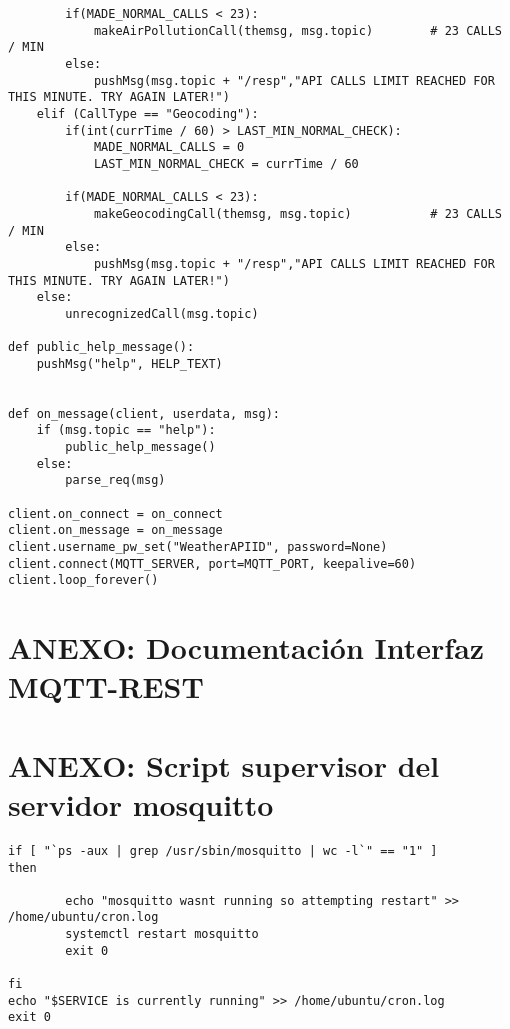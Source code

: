 \documentclass{scrbook}
\begin{document}
{\begin{verbatim}
        if(MADE_NORMAL_CALLS < 23):
            makeAirPollutionCall(themsg, msg.topic)        # 23 CALLS / MIN
        else:
            pushMsg(msg.topic + "/resp","API CALLS LIMIT REACHED FOR THIS MINUTE. TRY AGAIN LATER!")
    elif (CallType == "Geocoding"):
        if(int(currTime / 60) > LAST_MIN_NORMAL_CHECK):
            MADE_NORMAL_CALLS = 0
            LAST_MIN_NORMAL_CHECK = currTime / 60

        if(MADE_NORMAL_CALLS < 23):
            makeGeocodingCall(themsg, msg.topic)           # 23 CALLS / MIN
        else:
            pushMsg(msg.topic + "/resp","API CALLS LIMIT REACHED FOR THIS MINUTE. TRY AGAIN LATER!")
    else:
        unrecognizedCall(msg.topic)

def public_help_message():
    pushMsg("help", HELP_TEXT)


def on_message(client, userdata, msg):
    if (msg.topic == "help"):
        public_help_message()
    else:
        parse_req(msg)
    
client.on_connect = on_connect
client.on_message = on_message
client.username_pw_set("WeatherAPIID", password=None)
client.connect(MQTT_SERVER, port=MQTT_PORT, keepalive=60)
client.loop_forever()
\end{verbatim}
}

\chapter{ANEXO: Documentación Interfaz MQTT-REST}
\label{anexo:IMR-docs}

\chapter{ANEXO: Script supervisor del servidor mosquitto}
\label{anexo:supervisor-mqtt}
\begin{verbatim}
if [ "`ps -aux | grep /usr/sbin/mosquitto | wc -l`" == "1" ]
then

        echo "mosquitto wasnt running so attempting restart" >> /home/ubuntu/cron.log
        systemctl restart mosquitto
        exit 0

fi
echo "$SERVICE is currently running" >> /home/ubuntu/cron.log
exit 0
\end{verbatim}
\end{document}
